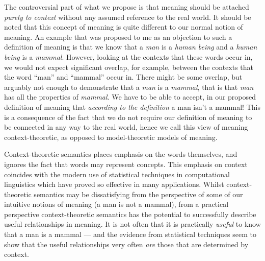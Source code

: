 The controversial part of what we propose is that meaning should be attached \emph{purely to context} without any assumed reference to the real world. It should be noted that this concept of meaning is quite different to our normal notion of meaning. An example that was proposed to me as an objection to such a definition of meaning is that we know that a \emph{man} is a \emph{human being} and a \emph{human being} is a \emph{mammal}. However, looking at the contexts that these words occur in, we would not expect significant overlap, for example, between the contexts that the word ``man'' and ``mammal'' occur in. There might be some overlap, but arguably not enough to demonstrate that a \emph{man} is a \emph{mammal}, that is that \emph{man} has all the properties of \emph{mammal}. We have to be able to accept, in our proposed definition of meaning that \emph{according to the definition} a man isn't a mammal! This is a consequence of the fact that we do not require our definition of meaning to be connected in any way to the real world, hence we call this view of meaning context-theoretic, as opposed to model-theoretic models of meaning.

Context-theoretic semantics places emphasis on the words themselves, and ignores the fact that words may represent concepts. This emphasis on context coincides with the modern use of statistical techniques in computational linguistics which have proved so effective in many applications. Whilst context-theoretic semantics may be dissatisfying from the perspective of some of our intuitive notions of meaning (a man is not a mammal), from a practical perspective context-theoretic semantics has the potential to successfully describe useful relationships in meaning. It is not often that it is practically \emph{useful} to know that a man is a mammal --- and the evidence from statistical techniques seem to show that the useful relationships very often \emph{are} those that are determined by context.

